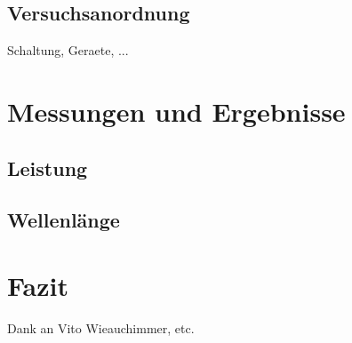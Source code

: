 \documentclass[11pt]{scrartcl}
\begin{document}
\subsection{Versuchsanordnung}
Schaltung, Geraete, ...
\section{Messungen und Ergebnisse}
\subsection{Leistung}
\subsection{Wellenl\"ange}
\section{Fazit}
Dank an Vito Wieauchimmer, etc.
\end{document}
